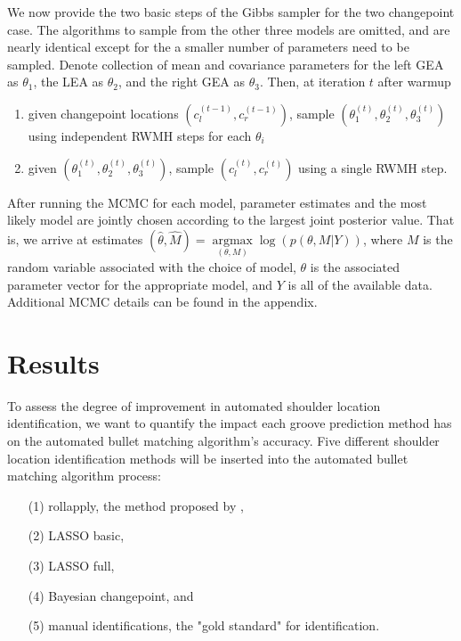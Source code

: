 \documentclass[12pt]{article}
\providecommand{\tightlist}{%
  \setlength{\itemsep}{0pt}\setlength{\parskip}{0pt}}
\begin{document}
We now provide the two basic steps of the Gibbs sampler for the two
changepoint case. The algorithms to sample from the other three models
are omitted, and are nearly identical except for the a smaller number of
parameters need to be sampled. Denote collection of mean and covariance
parameters for the left GEA as \(\theta_1\), the LEA as \(\theta_2\),
and the right GEA as \(\theta_3\). Then, at iteration \(t\) after warmup

\begin{enumerate}
\def\labelenumi{\arabic{enumi}.}
\tightlist
\item
  given changepoint locations \((c_l^{(t - 1)}, c_r^{(t - 1)})\), sample
  \((\theta_1^{(t)}, \theta_2^{(t)}, \theta_3^{(t)})\) using independent
  RWMH steps for each \(\theta_i\)\\
\item
  given \((\theta_1^{(t)}, \theta_2^{(t)}, \theta_3^{(t)})\), sample
  \((c_l^{(t)}, c_r^{(t)})\) using a single RWMH step.
\end{enumerate}

After running the MCMC for each model, parameter estimates and the most
likely model are jointly chosen according to the largest joint posterior
value. That is, we arrive at estimates
\((\hat{\theta}, \hat{M}) = \underset{(\theta, M)}{\operatorname{argmax}}{\log(p(\theta, M | Y))}\),
where \(M\) is the random variable associated with the choice of model,
\(\theta\) is the associated parameter vector for the appropriate model,
and \(Y\) is all of the available data. Additional MCMC details can be
found in the appendix.

\section{Results}

To assess the degree of improvement in automated shoulder location
identification, we want to quantify the impact each groove prediction
method has on the automated bullet matching algorithm's accuracy. Five
different shoulder location identification methods will be inserted into
the automated bullet matching algorithm process:

\begin{itemize}
\item[(1)] rollapply, the method proposed by \cite{Hare1}, 
\item[(2)] LASSO basic, 
\item[(3)] LASSO full,
\item[(4)] Bayesian changepoint, and
\item[(5)] manual identifications, the "gold standard" for identification.  
\end{itemize}
\end{document}

